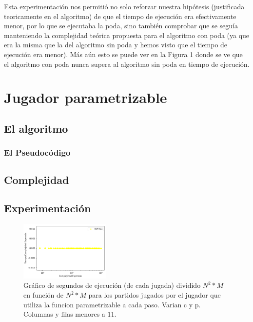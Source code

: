 \documentclass[A4paper,oneside,fleqn,11pt]{article}
\theoremstyle{definition}
\begin{document}
Esta experimentación nos permitió no solo reforzar nuestra hipótesis (justificada teoricamente en el algoritmo) de que el tiempo de ejecución era efectivamente menor, por lo que se ejecutaba la poda, sino también comprobar que se seguía manteniendo la complejidad teórica propuesta para el algoritmo con poda (ya que era la misma que la del algoritmo sin poda y hemos visto que el tiempo de ejecución era menor). Más aún esto se puede ver en la Figura 1 donde se ve que el algoritmo con poda nunca supera al algoritmo sin poda en tiempo de ejecución.



















\section{Jugador parametrizable}


\subsection{El algoritmo}

\subsubsection{El Pseudocódigo}



\subsection{Complejidad}



\subsection{Experimentación}


\begin{figure}
	\includegraphics[width=0.4\textwidth]{complejidad2.png}
	\caption{ Gráfico de segundos de ejecución (de cada jugada) dividido $N^2 *M$ en función de $N^2 * M$ para los partidos jugados por el jugador que utiliza la funcion parametrizable a cada paso. Varian c y p. Columnas y filas menores a 11.}
\end{figure}
\end{document}

